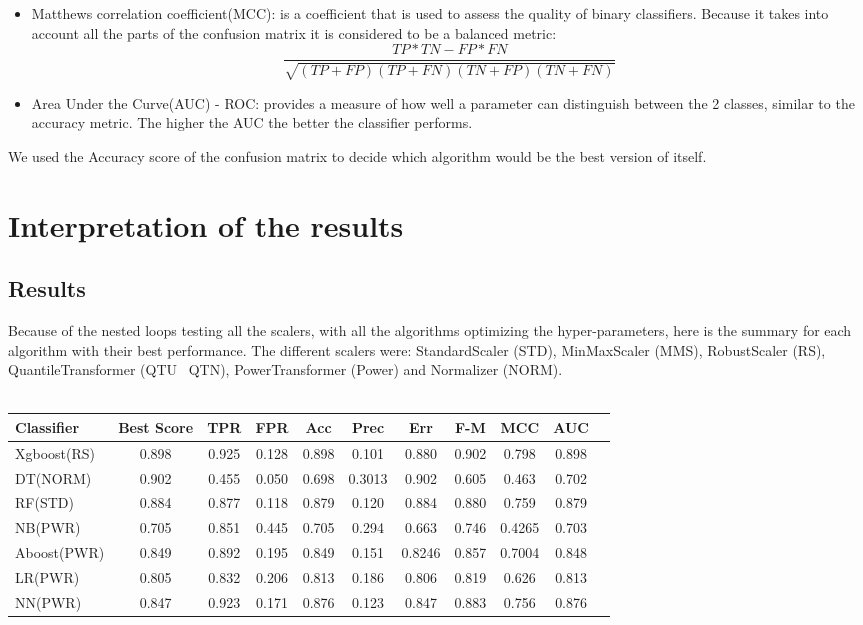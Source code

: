 \begin{itemize}
\item Matthews correlation coefficient(MCC): is a coefficient that is used to assess the quality of binary classifiers. Because it takes into account all the parts of the confusion matrix it is considered to be a balanced metric: 
\begin{equation}
\frac{TP*TN - FP*FN}{\sqrt{(TP+FP)(TP+FN)(TN+FP)(TN+FN)}}
\end{equation}
\item Area Under the Curve(AUC) - ROC:  provides a measure of how well a parameter can distinguish between the 2 classes, similar to the accuracy metric. The higher the AUC the better the classifier performs.
\end{itemize}

We used the Accuracy score of the confusion matrix to decide which algorithm would be the best version of itself.

\section{Interpretation of the results}
\subsection{Results}
Because of the nested loops testing all the scalers, with all the algorithms optimizing the hyper-parameters, here is the summary for each algorithm with their best performance. The different scalers were: StandardScaler (STD), MinMaxScaler (MMS), RobustScaler (RS), QuantileTransformer (QTU \ QTN), PowerTransformer (Power) and Normalizer (NORM).\\\\
\begin{tabular}{l|c|c|c|c|c|c|c|c|c|c|}
Classifier & Best Score & TPR & FPR & Acc & Prec & Err & F-M & MCC & AUC\\
\hline
Xgboost(RS) & 0.898 & 0.925 & 0.128 & 0.898 & 0.101 & 0.880 & 0.902 & 0.798 & 0.898\\
\hline
DT(NORM) & 0.902 & 0.455 & 0.050 & 0.698 & 0.3013 & 0.902 & 0.605 & 0.463 & 0.702\\
\hline
RF(STD) & 0.884 & 0.877 & 0.118 & 0.879 & 0.120 & 0.884 & 0.880 & 0.759 & 0.879\\
\hline
NB(PWR) & 0.705 & 0.851 & 0.445 & 0.705 & 0.294 & 0.663 & 0.746 & 0.4265 & 0.703\\
\hline
Aboost(PWR) & 0.849 & 0.892 & 0.195 & 0.849 & 0.151 & 0.8246 & 0.857 & 0.7004 & 0.848\\
\hline
LR(PWR) & 0.805 & 0.832 & 0.206 & 0.813 & 0.186 & 0.806 & 0.819 & 0.626 & 0.813\\
\hline
NN(PWR) & 0.847 & 0.923 & 0.171 & 0.876 & 0.123 & 0.847 & 0.883 & 0.756 & 0.876\\
\hline
\end{tabular}

